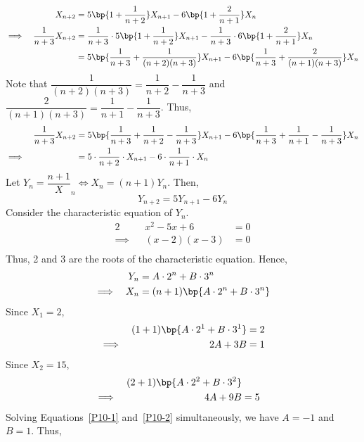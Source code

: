 \documentclass{echw}
\begin{document}
    \solution
        \begin{alignat*}{2}
            &&X_{n+2} &= 5\bp{1 + \dfrac1{n+2}}X_{n+1} - 6\bp{1 + \dfrac2{n+1}}X_n\\
            \implies&&\dfrac1{n+3}X_{n+2} &= \dfrac1{n+3} \cdot 5\bp{1 + \dfrac1{n+2}}X_{n+1} - \dfrac1{n+3} \cdot 6\bp{1 + \dfrac2{n+1}}X_n\\
            && &= 5\bp{\dfrac1{n+3} + \dfrac1{(n+2)(n+3)}}X_{n+1} - 6\bp{\dfrac1{n+3} + \dfrac2{(n+1)(n+3)}}X_n
        \end{alignat*}
        Note that $\dfrac1{(n+2)(n+3)} = \dfrac1{n+2} - \dfrac1{n+3}$ and $\dfrac{2}{(n+1)(n+3)} = \dfrac1{n+1} - \dfrac1{n+3}$. Thus,
        \begin{alignat*}{2}
            &&\dfrac1{n+3}X_{n+2} &= 5\bp{\dfrac1{n+3} + \dfrac1{n+2} - \dfrac1{n+3}}X_{n+1} - 6\bp{\dfrac1{n+3} + \dfrac1{n+1} - \dfrac1{n+3}}X_n\\
            \implies&& &= 5\cdot \dfrac1{n+2} \cdot X_{n+1} - 6\cdot \dfrac1{n+1} \cdot X_n
        \end{alignat*}
        Let $Y_n = \dfrac{n + 1}X_n \iff X_n = (n+1)Y_n$. Then,
        \[
            Y_{n+2} = 5 Y_{n+1} - 6Y_n
        \]
        Consider the characteristic equation of $Y_n$.
        \begin{alignat*}{2}
            &&x^2 - 5x + 6 &= 0\\
            \implies&&(x-2)(x-3) &= 0\\
        \end{alignat*}
        Thus, 2 and 3 are the roots of the characteristic equation. Hence,
        \begin{alignat*}{2}
            &&Y_n &= A \cdot 2^n + B \cdot 3^n\\
            \implies&&X_n &= (n+1)\bp{A \cdot 2^n + B \cdot 3^n}
        \end{alignat*}
        Since $X_1 = 2$,
        \begin{alignat}{2}
            &&(1+1)\bp{A \cdot 2^1 + B \cdot 3^1} &= 2\nonumber\\
            \implies&&2A + 3B &= 1\label{P10-1}
        \end{alignat}
        Since $X_2 = 15$,
        \begin{alignat}{2}
            &&(2+1)\bp{A \cdot 2^2 + B \cdot 3^2}\nonumber\\
            \implies&&4A + 9B &= 5\label{P10-2}
        \end{alignat}
        Solving Equations~\ref{P10-1} and~\ref{P10-2} simultaneously, we have $A = -1$ and $B = 1$. Thus,
\end{document}
